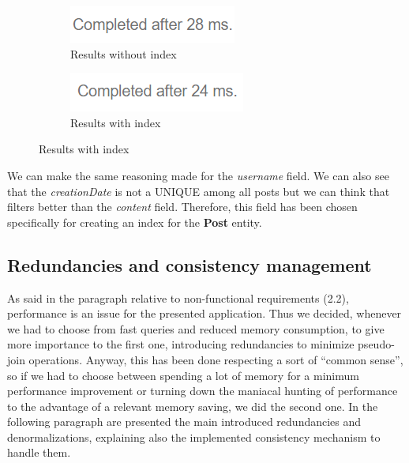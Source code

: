 \begin{figure}[H]
\begin{subfigure}{0.5\textwidth}
	\end{subfigure}
\end{figure}
\begin{figure}[H]
	\begin{subfigure}{0.5\textwidth}
		\includegraphics[width=0.9\linewidth]{img/post_without_index_2.png} 
		\caption{Results without index}
	\end{subfigure}
	\begin{subfigure}{0.5\textwidth}
		\includegraphics[width=0.9\linewidth]{img/post_with_index_2.png}
		\caption{Results with index}
	\end{subfigure}
\end{figure}

We can make the same reasoning made for the \textit{username} field. We can also see that the \textit{creationDate} is not a UNIQUE among all posts but we can think that filters better than the \textit{content} field. Therefore, this field has been chosen specifically for creating an index for the \textbf{Post} entity.

\subsection{Redundancies and consistency management}
As said in the paragraph relative to non-functional requirements (2.2), performance is an issue for the presented application. Thus we decided, whenever we had to choose from fast queries and reduced memory consumption, to give more importance to the first one, introducing redundancies to minimize pseudo-join operations.
Anyway, this has been done respecting a sort of “common sense”, so if we had to choose between spending a lot of memory for a minimum performance improvement or turning down the maniacal hunting of performance to the advantage of a relevant memory saving, we did the second one.  
In the following paragraph are presented the main introduced redundancies and denormalizations, explaining also the implemented consistency mechanism to handle them.

